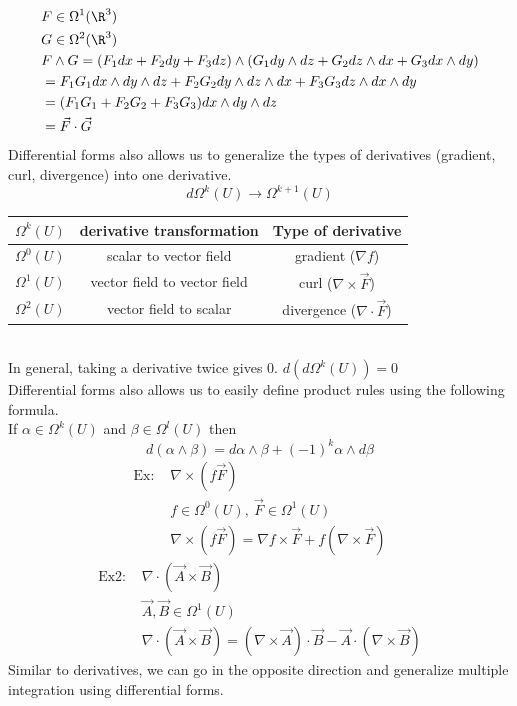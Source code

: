 \begin{align*}
    &F\in\Omega^1(\R^3)\\
    &G\in\Omega^2(\R^3)\\
    &F\wedge G=(F_1dx+F_2dy+F_3dz)\wedge(G_1dy\wedge dz+G_2dz\wedge dx+G_3dx\wedge dy)\\
    &=F_1G_1dx\wedge dy\wedge dz+F_2G_2 dy\wedge dz\wedge dx+F_3G_3 dz\wedge dx\wedge dy\\
    &=(F_1G_1+F_2G_2+F_3G_3)dx\wedge dy\wedge dz\\
    &=\vec{F}\cdot \vec{G}
\end{align*}
Differential forms also allows us to generalize the types of derivatives (gradient, curl, divergence) into one derivative.
$$d\Omega^k(U)\to\Omega^{k+1}(U)$$
\begin{tabular}{c|c|c}
    $\Omega^k(U)$ & derivative transformation & Type of derivative\\
    \hline
    $\Omega^0(U)$ & scalar to vector field & gradient ($\nabla f$)\\
    $\Omega^1(U)$ & vector field to vector field & curl ($\nabla\times \vec{F}$)\\
    $\Omega^2(U)$ & vector field to scalar & divergence ($\nabla\cdot\vec{F}$)
\end{tabular}\\
In general, taking a derivative twice gives 0. $d(d\Omega^k(U))=0$\\
Differential forms also allows us to easily define product rules using the following formula.\\
If $\alpha\in\Omega^k(U)$ and $\beta\in\Omega^l(U)$ then
$$d(\alpha\wedge\beta)=d\alpha\wedge\beta+(-1)^k\alpha\wedge d\beta$$
\begin{align*}
    \text{Ex: }&\nabla\times(f\vec{F})\\
    &f\in\Omega^0(U),\ \vec{F}\in\Omega^1(U)\\
    &\nabla\times(f\vec{F})=\nabla f\times\vec{F}+f(\nabla\times\vec{F})
\end{align*}
\begin{align*}
    \text{Ex2: }&\nabla\cdot(\vec{A}\times\vec{B})\\
    &\vec{A},\vec{B}\in\Omega^1(U)\\
    &\nabla\cdot(\vec{A}\times\vec{B})=(\nabla\times\vec{A})\cdot\vec{B}-\vec{A}\cdot(\nabla\times\vec{B})
\end{align*}
Similar to derivatives, we can go in the opposite direction and generalize multiple integration using differential forms.\\
